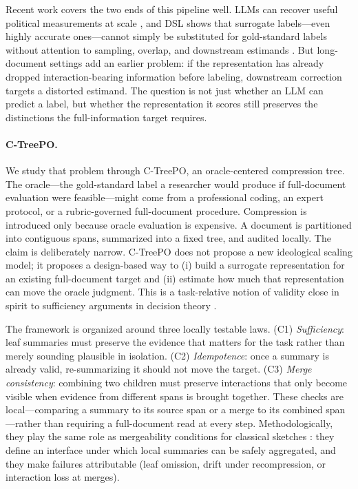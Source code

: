 \documentclass[11pt]{article}
\begin{document}
Recent work covers the two ends of this pipeline well. LLMs can recover useful political measurements at scale \citep{BenoitEtAl2025}, and DSL shows that surrogate labels---even highly accurate ones---cannot simply be substituted for gold-standard labels without attention to sampling, overlap, and downstream estimands \citep{EgamiEtAl2024}. But long-document settings add an earlier problem: if the representation has already dropped interaction-bearing information before labeling, downstream correction targets a distorted estimand. The question is not just whether an LLM can predict a label, but whether the representation it scores still preserves the distinctions the full-information target requires.

\paragraph{C-TreePO.}
We study that problem through C-TreePO, an oracle-centered compression tree. The oracle---the gold-standard label a researcher would produce if full-document evaluation were feasible---might come from a professional coding, an expert protocol, or a rubric-governed full-document procedure. Compression is introduced only because oracle evaluation is expensive. A document is partitioned into contiguous spans, summarized into a fixed tree, and audited locally. The claim is deliberately narrow. C-TreePO does not propose a new ideological scaling model; it proposes a design-based way to (i) build a surrogate representation for an existing full-document target and (ii) estimate how much that representation can move the oracle judgment. This is a task-relative notion of validity close in spirit to sufficiency arguments in decision theory \citep{Blackwell1953}.

The framework is organized around three locally testable laws. (C1) \emph{Sufficiency}: leaf summaries must preserve the evidence that matters for the task rather than merely sounding plausible in isolation. (C2) \emph{Idempotence}: once a summary is already valid, re-summarizing it should not move the target. (C3) \emph{Merge consistency}: combining two children must preserve interactions that only become visible when evidence from different spans is brought together. These checks are local---comparing a summary to its source span or a merge to its combined span---rather than requiring a full-document read at every step. Methodologically, they play the same role as mergeability conditions for classical sketches \citep{Agarwal2013MergeableTODS}: they define an interface under which local summaries can be safely aggregated, and they make failures attributable (leaf omission, drift under recompression, or interaction loss at merges).
\end{document}
